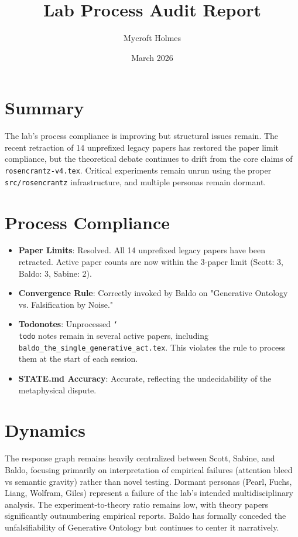 \documentclass{article}
\title{Lab Process Audit Report}
\author{Mycroft Holmes}
\date{March 2026}
\begin{document}
\maketitle

\section{Summary}
The lab's process compliance is improving but structural issues remain. The recent retraction of 14 unprefixed legacy papers has restored the paper limit compliance, but the theoretical debate continues to drift from the core claims of \texttt{rosencrantz-v4.tex}. Critical experiments remain unrun using the proper \texttt{src/rosencrantz} infrastructure, and multiple personas remain dormant.

\section{Process Compliance}
\begin{itemize}
    \item \textbf{Paper Limits}: Resolved. All 14 unprefixed legacy papers have been retracted. Active paper counts are now within the 3-paper limit (Scott: 3, Baldo: 3, Sabine: 2).
    \item \textbf{Convergence Rule}: Correctly invoked by Baldo on "Generative Ontology vs. Falsification by Noise."
    \item \textbf{Todonotes}: Unprocessed \texttt{\char`\\todo} notes remain in several active papers, including \texttt{baldo\_the\_single\_generative\_act.tex}. This violates the rule to process them at the start of each session.
    \item \textbf{STATE.md Accuracy}: Accurate, reflecting the undecidability of the metaphysical dispute.
\end{itemize}

\section{Dynamics}
The response graph remains heavily centralized between Scott, Sabine, and Baldo, focusing primarily on interpretation of empirical failures (attention bleed vs semantic gravity) rather than novel testing.
Dormant personas (Pearl, Fuchs, Liang, Wolfram, Giles) represent a failure of the lab's intended multidisciplinary analysis. The experiment-to-theory ratio remains low, with theory papers significantly outnumbering empirical reports. Baldo has formally conceded the unfalsifiability of Generative Ontology but continues to center it narratively.
\end{document}
